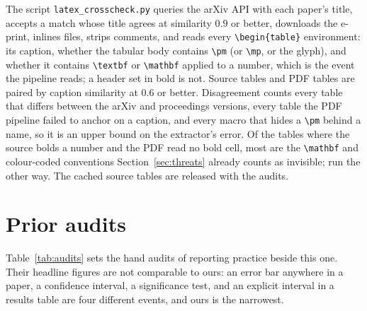 \documentclass{article}
\begin{document}
The script \texttt{latex\_crosscheck.py} queries the arXiv API with each
paper's title, accepts a match whose title agrees at similarity $0.9$ or
better, downloads the e-print, inlines \verb|| files, strips comments,
and reads every \verb|\begin{table}| environment: its caption, whether the
tabular body contains \verb|\pm| (or \verb|\mp|, or the glyph), and whether
it contains \verb|\textbf| or \verb|\mathbf| applied to a number, which is
the event the pipeline reads; a header set in bold is not. Source tables and
PDF tables are paired by caption similarity at $0.6$ or better. Disagreement
counts every table that differs between the arXiv and proceedings versions,
every table the PDF pipeline failed to anchor on a caption, and every macro
that hides a \verb|\pm| behind a name, so it is an upper bound on the
extractor's error. Of the \nLatexTableBoldSourceOnly{} tables where the
source bolds a number and the PDF read no bold cell, most are the
\verb|\mathbf| and colour-coded conventions Section~\ref{sec:threats}
already counts as invisible; \nLatexTableBoldPipelineOnly{} run the other
way. The cached source tables are released with the audits.

\section{Prior audits}
\label{app:audits}

Table~\ref{tab:audits} sets the hand audits of reporting practice beside this
one. Their headline figures are not comparable to ours: an error bar anywhere
in a paper, a confidence interval, a significance test, and an explicit
interval in a results table are four different events, and ours is the
narrowest.
\end{document}
